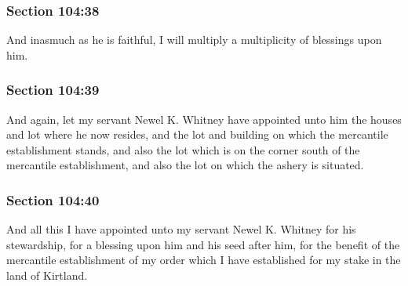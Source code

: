	\subsubsection{Section 104:38} %
		\label{DC104-38}

		And inasmuch as he is faithful, I will multiply a multiplicity of blessings upon him.


	\subsubsection{Section 104:39} %
		\label{DC104-39}

		And again, let my servant Newel K. Whitney have appointed unto him the houses and lot where he now resides, and the lot and building on which the mercantile establishment stands, and also the lot which is on the corner south of the mercantile establishment, and also the lot on which the ashery is situated.


	\subsubsection{Section 104:40} %
		\label{DC104-40}

		And all this I have appointed unto my servant Newel K. Whitney for his stewardship, for a blessing upon him and his seed after him, for the benefit of the mercantile establishment of my order which I have established for my stake in the land of Kirtland.


